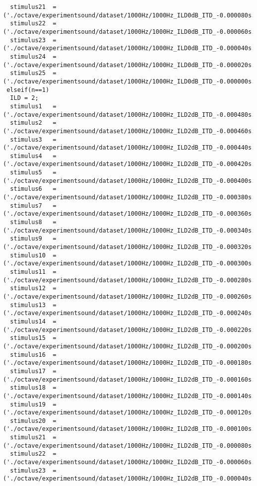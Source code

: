 {\begin{verbatim}
  stimulus21  =('./octave/experimentsound/dataset/1000Hz/1000Hz_ILD0dB_ITD_-0.000080s.wav');
  stimulus22  =('./octave/experimentsound/dataset/1000Hz/1000Hz_ILD0dB_ITD_-0.000060s.wav');
  stimulus23  =('./octave/experimentsound/dataset/1000Hz/1000Hz_ILD0dB_ITD_-0.000040s.wav');
  stimulus24  =('./octave/experimentsound/dataset/1000Hz/1000Hz_ILD0dB_ITD_-0.000020s.wav');
  stimulus25  =('./octave/experimentsound/dataset/1000Hz/1000Hz_ILD0dB_ITD_-0.000000s.wav');
 elseif(n==1)
  ILD = 2;
  stimulus1   =('./octave/experimentsound/dataset/1000Hz/1000Hz_ILD2dB_ITD_-0.000480s.wav');
  stimulus2   =('./octave/experimentsound/dataset/1000Hz/1000Hz_ILD2dB_ITD_-0.000460s.wav');
  stimulus3   =('./octave/experimentsound/dataset/1000Hz/1000Hz_ILD2dB_ITD_-0.000440s.wav');
  stimulus4   =('./octave/experimentsound/dataset/1000Hz/1000Hz_ILD2dB_ITD_-0.000420s.wav');
  stimulus5   =('./octave/experimentsound/dataset/1000Hz/1000Hz_ILD2dB_ITD_-0.000400s.wav');
  stimulus6   =('./octave/experimentsound/dataset/1000Hz/1000Hz_ILD2dB_ITD_-0.000380s.wav');
  stimulus7   =('./octave/experimentsound/dataset/1000Hz/1000Hz_ILD2dB_ITD_-0.000360s.wav');
  stimulus8   =('./octave/experimentsound/dataset/1000Hz/1000Hz_ILD2dB_ITD_-0.000340s.wav');
  stimulus9   =('./octave/experimentsound/dataset/1000Hz/1000Hz_ILD2dB_ITD_-0.000320s.wav');
  stimulus10  =('./octave/experimentsound/dataset/1000Hz/1000Hz_ILD2dB_ITD_-0.000300s.wav');
  stimulus11  =('./octave/experimentsound/dataset/1000Hz/1000Hz_ILD2dB_ITD_-0.000280s.wav');
  stimulus12  =('./octave/experimentsound/dataset/1000Hz/1000Hz_ILD2dB_ITD_-0.000260s.wav');
  stimulus13  =('./octave/experimentsound/dataset/1000Hz/1000Hz_ILD2dB_ITD_-0.000240s.wav');
  stimulus14  =('./octave/experimentsound/dataset/1000Hz/1000Hz_ILD2dB_ITD_-0.000220s.wav');
  stimulus15  =('./octave/experimentsound/dataset/1000Hz/1000Hz_ILD2dB_ITD_-0.000200s.wav');
  stimulus16  =('./octave/experimentsound/dataset/1000Hz/1000Hz_ILD2dB_ITD_-0.000180s.wav');
  stimulus17  =('./octave/experimentsound/dataset/1000Hz/1000Hz_ILD2dB_ITD_-0.000160s.wav');
  stimulus18  =('./octave/experimentsound/dataset/1000Hz/1000Hz_ILD2dB_ITD_-0.000140s.wav');
  stimulus19  =('./octave/experimentsound/dataset/1000Hz/1000Hz_ILD2dB_ITD_-0.000120s.wav');
  stimulus20  =('./octave/experimentsound/dataset/1000Hz/1000Hz_ILD2dB_ITD_-0.000100s.wav');
  stimulus21  =('./octave/experimentsound/dataset/1000Hz/1000Hz_ILD2dB_ITD_-0.000080s.wav');
  stimulus22  =('./octave/experimentsound/dataset/1000Hz/1000Hz_ILD2dB_ITD_-0.000060s.wav');
  stimulus23  =('./octave/experimentsound/dataset/1000Hz/1000Hz_ILD2dB_ITD_-0.000040s.wav');

\end{verbatim}}
